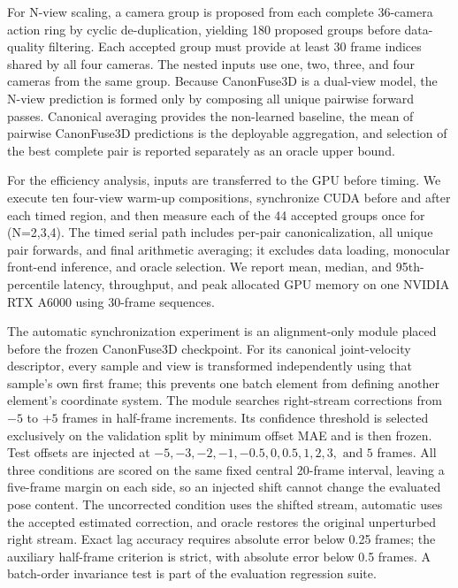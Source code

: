\documentclass[11pt,letterpaper]{article}
\begin{document}
For N-view scaling, a camera group is proposed from each complete 36-camera action ring by cyclic de-duplication, yielding 180 proposed groups before data-quality filtering. Each accepted group must provide at least 30 frame indices shared by all four cameras. The nested inputs use one, two, three, and four cameras from the same group. Because CanonFuse3D is a dual-view model, the N-view prediction is formed only by composing all unique pairwise forward passes. Canonical averaging provides the non-learned baseline, the mean of pairwise CanonFuse3D predictions is the deployable aggregation, and selection of the best complete pair is reported separately as an oracle upper bound.

For the efficiency analysis, inputs are transferred to the GPU before timing. We execute ten four-view warm-up compositions, synchronize CUDA before and after each timed region, and then measure each of the 44 accepted groups once for (N=2,3,4). The timed serial path includes per-pair canonicalization, all unique pair forwards, and final arithmetic averaging; it excludes data loading, monocular front-end inference, and oracle selection. We report mean, median, and 95th-percentile latency, throughput, and peak allocated GPU memory on one NVIDIA RTX A6000 using 30-frame sequences.

The automatic synchronization experiment is an alignment-only module placed before the frozen CanonFuse3D checkpoint. For its canonical joint-velocity descriptor, every sample and view is transformed independently using that sample's own first frame; this prevents one batch element from defining another element's coordinate system. The module searches right-stream corrections from \(-5\) to \(+5\) frames in half-frame increments. Its confidence threshold is selected exclusively on the validation split by minimum offset MAE and is then frozen. Test offsets are injected at \(-5,-3,-2,-1,-0.5,0,0.5,1,2,3,\text{ and }5\) frames. All three conditions are scored on the same fixed central 20-frame interval, leaving a five-frame margin on each side, so an injected shift cannot change the evaluated pose content. The uncorrected condition uses the shifted stream, automatic uses the accepted estimated correction, and oracle restores the original unperturbed right stream. Exact lag accuracy requires absolute error below 0.25 frames; the auxiliary half-frame criterion is strict, with absolute error below 0.5 frames. A batch-order invariance test is part of the evaluation regression suite.
\end{document}
